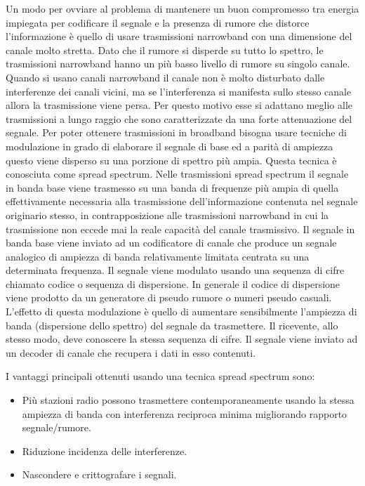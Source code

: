 \documentclass[12pt,a4paper,openright,twoside]{report}
\begin{document}
Un modo per ovviare al problema di mantenere un buon compromesso tra energia impiegata per codificare il segnale e la presenza di rumore che distorce l'informazione \`e quello di usare trasmissioni narrowband con una dimensione del canale molto stretta. 
Dato che il rumore si disperde su tutto lo spettro, le trasmissioni narrowband hanno un pi\`u basso livello di rumore su singolo canale. Quando si usano canali narrowband il canale non \`e molto disturbato dalle interferenze dei canali vicini, ma se l'interferenza si manifesta sullo stesso canale allora la trasmissione viene persa. 
Per questo motivo esse si adattano meglio alle trasmissioni a lungo raggio che sono caratterizzate da una forte attenuazione del segnale.
Per poter ottenere trasmissioni in broadband bisogna usare tecniche di modulazione in grado di elaborare il segnale di base ed a parit\`a di ampiezza questo viene disperso su una porzione di spettro pi\`u ampia. Questa tecnica \`e conosciuta come spread spectrum.
Nelle trasmissioni spread spectrum il segnale in banda base viene trasmesso su una banda di frequenze pi\`u ampia di quella effettivamente necessaria alla trasmissione dell'informazione contenuta nel segnale originario stesso, in contrapposizione alle trasmissioni narrowband in cui la trasmissione non eccede mai la reale capacit\`a del canale trasmissivo.
Il segnale in banda base viene inviato ad un codificatore di canale che produce un segnale analogico di ampiezza di banda relativamente limitata centrata su una determinata frequenza. Il segnale viene modulato usando una sequenza di cifre chiamato codice o sequenza di dispersione. In generale il codice di dispersione viene prodotto da un generatore di pseudo rumore o numeri pseudo casuali. L'effetto di questa modulazione \`e quello di aumentare sensibilmente l'ampiezza di banda (dispersione dello spettro) del segnale da trasmettere. Il ricevente, allo stesso modo, deve conoscere la stessa sequenza di cifre. Il segnale viene inviato ad un decoder di canale che recupera i dati in esso contenuti. 

I vantaggi principali ottenuti usando una tecnica spread spectrum sono:
\begin{itemize}                       
\item Pi\`u stazioni radio possono trasmettere contemporaneamente usando la stessa ampiezza di banda con interferenza reciproca minima migliorando rapporto segnale/rumore.
\item Riduzione incidenza delle interferenze.
\item Nascondere e crittografare i segnali.  
\end{itemize}
\end{document}
